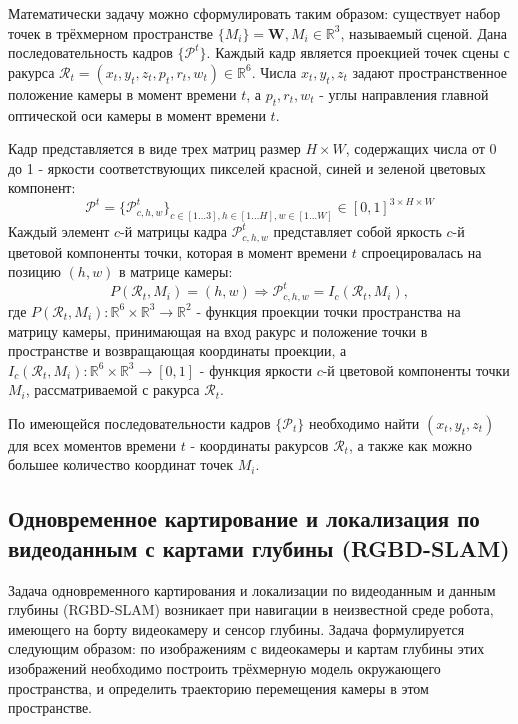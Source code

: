 \documentclass{mipt-thesis-ms}
\begin{document}
	Математически задачу можно сформулировать таким образом: существует набор точек в трёхмерном пространстве $\{M_i \} = \textbf{W}, M_i \in \mathbb{R}^3$, называемый сценой. Дана последовательность кадров $\{\mathcal{P}^t\}$. Каждый кадр является проекцией точек сцены с ракурса $\mathcal{R}_t = (x_t, y_t, z_t, p_t, r_t, w_t) \in \mathbb{R}^6$. Числа $x_t, y_t, z_t$ задают пространственное положение камеры в момент времени $t$, а $p_t, r_t, w_t$ - углы направления главной оптической оси камеры в момент времени $t$.
	
	Кадр представляется в виде трех матриц размер $H \times W$, содержащих числа от 0 до 1 - яркости соответствующих пикселей красной, синей и зеленой цветовых компонент:
	$$\mathcal{P}^t = \{\mathcal{P}^t_{c,h,w}\}_{c \in [1 \dots 3], h \in [1 \dots H], w \in [1 \dots W]} \in [0, 1]^{3 \times H \times W}$$
	Каждый элемент $c$-й матрицы кадра $\mathcal{P}^t_{c,h,w}$ представляет собой яркость $c$-й цветовой компоненты точки, которая в момент времени $t$ спроецировалась на позицию $(h, w)$ в матрице камеры:
	$$P(\mathcal{R}_t, M_i) = (h, w) \Rightarrow \mathcal{P}^t_{c,h,w} = I_c(\mathcal{R}_t, M_i),$$
	где $P(\mathcal{R}_t, M_i): \mathbb{R}^6 \times \mathbb{R}^3 \rightarrow \mathbb{R}^2$ - функция проекции точки пространства на матрицу камеры, принимающая на вход ракурс и положение точки в пространстве и возвращающая координаты проекции, а $I_c (\mathcal{R}_t, M_i): \mathbb{R}^6 \times \mathbb{R}^3 \rightarrow [0, 1]$ - функция яркости $c$-й цветовой компоненты точки $M_i$, рассматриваемой с ракурса $\mathcal{R}_t$.
	
	По имеющейся последовательности кадров $\{\mathcal{P}_t\}$ необходимо найти $(x_t, y_t, z_t)$ для всех моментов времени $t$ - координаты ракурсов $\mathcal{R}_t$, а также как можно большее количество координат точек $M_i$.
	
	\subsection{Одновременное картирование и локализация по видеоданным с картами глубины (RGBD-SLAM)}
	
	Задача одновременного картирования и локализации по видеоданным и данным глубины (RGBD-SLAM) возникает при навигации в неизвестной среде робота, имеющего на борту видеокамеру и сенсор глубины. Задача формулируется следующим образом: по изображениям с видеокамеры и картам глубины этих изображений необходимо построить трёхмерную модель окружающего пространства, и определить траекторию перемещения камеры в этом пространстве.
	
\end{document}
